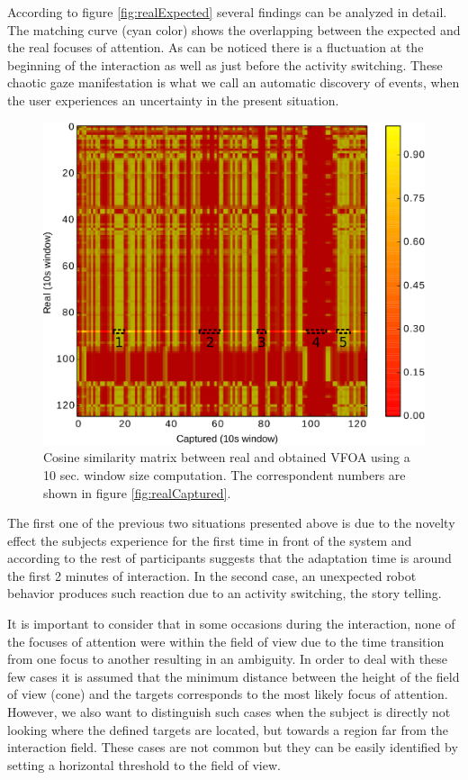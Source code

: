 \documentclass{sig-alternate}
\begin{document}
According to figure \ref{fig:realExpected} several findings can be analyzed in detail. The matching curve (cyan color) shows the overlapping between the expected and the real focuses of attention. As can be noticed there is a fluctuation at the beginning of the interaction as well as just before the activity switching. These chaotic gaze manifestation is what we call an automatic discovery of events, when the user experiences an uncertainty in the present situation. 

\begin{figure}[h!]
    \centering
    \includegraphics[width=0.8\columnwidth]{bitmap}
    \caption{\small Cosine similarity matrix between real and obtained VFOA using a 10 sec. window size computation. The correspondent numbers are shown in figure \ref{fig:realCaptured}.}
    \label{fig:bitmap}
\end{figure}

The first one of the previous two situations presented above is due to the novelty effect the subjects experience for the first time in front of the system and according to the rest of participants suggests that the adaptation time is around the first 2 minutes of interaction. In the second case, an unexpected robot behavior produces such reaction due to an activity switching, the story telling.

It is important to consider that in some occasions during the interaction, none of the focuses of attention were within the field of view due to the time transition from one focus to another resulting in an ambiguity. In order to deal with these few cases it is assumed that the minimum distance between the height of the field of view (cone) and the targets corresponds to the most likely focus of attention. However, we also want to distinguish such cases when the subject is directly not looking where the defined targets are located, but towards a region far from the interaction field. These cases are not common but they can be easily identified by setting a horizontal threshold to the field of view.
\end{document}
